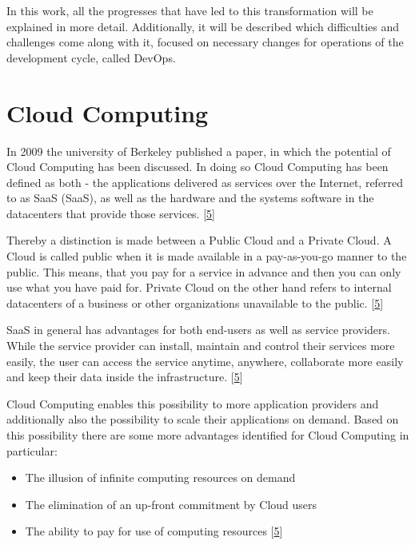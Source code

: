 \documentclass[12pt,english,a4paper,oneside,,tablecaptionabove]{scrbook}
\providecommand{\tightlist}{%
  \setlength{\itemsep}{0pt}\setlength{\parskip}{0pt}}
\begin{document}
In this work, all the progresses that have led to this transformation
will be explained in more detail. Additionally, it will be described
which difficulties and challenges come along with it, focused on
necessary changes for operations of the development cycle, called
DevOps.

\hypertarget{sec:cloud}{%
\section{Cloud Computing}\label{sec:cloud}}

In 2009 the university of Berkeley published a paper, in which the
potential of Cloud Computing has been discussed. In doing so Cloud
Computing has been defined as both - the applications delivered as
services over the Internet, referred to as \acl{SaaS} (\acs{SaaS}), as
well as the hardware and the systems software in the datacenters that
provide those services.
{[}\protect\hyperlink{ref-ArmbrustA.FoxandR.Griffith2009}{5}{]}

Thereby a distinction is made between a Public Cloud and a Private
Cloud. A Cloud is called public when it is made available in a
pay-as-you-go manner to the public. This means, that you pay for a
service in advance and then you can only use what you have paid for.
Private Cloud on the other hand refers to internal datacenters of a
business or other organizations unavailable to the public.
{[}\protect\hyperlink{ref-ArmbrustA.FoxandR.Griffith2009}{5}{]}

SaaS in general has advantages for both end-users as well as service
providers. While the service provider can install, maintain and control
their services more easily, the user can access the service anytime,
anywhere, collaborate more easily and keep their data inside the
infrastructure.
{[}\protect\hyperlink{ref-ArmbrustA.FoxandR.Griffith2009}{5}{]}

Cloud Computing enables this possibility to more application providers
and additionally also the possibility to scale their applications on
demand. Based on this possibility there are some more advantages
identified for Cloud Computing in particular:

\begin{itemize}
\tightlist
\item
  The illusion of infinite computing resources on demand
\item
  The elimination of an up-front commitment by Cloud users
\item
  The ability to pay for use of computing resources
  {[}\protect\hyperlink{ref-ArmbrustA.FoxandR.Griffith2009}{5}{]}
\end{itemize}
\end{document}
